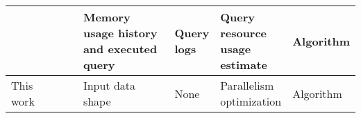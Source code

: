 \begin{table}[ht]
{\begin{tabular}{@{}|p{0.11\linewidth}|p{0.3\linewidth}|p{0.5\linewidth}|p{0.3\linewidth}|p{0.3\linewidth}|p{0.2\linewidth}|@{}}
      \cite{tang2021}      &                                      & Memory usage history and executed query                      & Query logs                               & Query resource usage estimate  & Algorithm            \\ \midrule
      This work            &                                      & Input data shape                                             & None                                     & Parallelism optimization       & Algorithm            \\ \midrule
    \end{tabular}
  }
\end{table}
